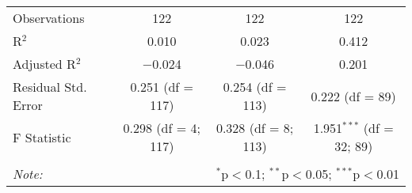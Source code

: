 \documentclass[11pt, oneside]{article}
\begin{document}
\begin{table}[!htbp]
\begin{tabular}{@{\extracolsep{5pt}}lccc}
Observations & 122 & 122 & 122 \\ 
R$^{2}$ & 0.010 & 0.023 & 0.412 \\ 
Adjusted R$^{2}$ & $-$0.024 & $-$0.046 & 0.201 \\ 
Residual Std. Error & 0.251 (df = 117) & 0.254 (df = 113) & 0.222 (df = 89) \\ 
F Statistic & 0.298 (df = 4; 117) & 0.328 (df = 8; 113) & 1.951$^{***}$ (df = 32; 89) \\ 
\hline 
\hline \\[-1.8ex] 
\textit{Note:}  & \multicolumn{3}{r}{$^{*}$p$<$0.1; $^{**}$p$<$0.05; $^{***}$p$<$0.01} \\ 
\end{tabular} 
\end{table} 
\end{document}
